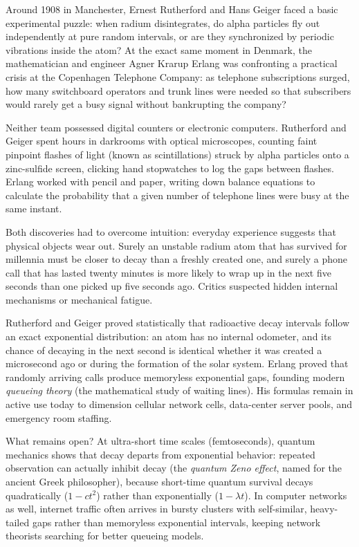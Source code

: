 \begin{historybox}
Around 1908 in Manchester, Ernest Rutherford and Hans Geiger faced a basic
experimental puzzle: when radium disintegrates, do alpha particles fly out
independently at pure random intervals, or are they synchronized by periodic
vibrations inside the atom? At the exact same moment in Denmark, the
mathematician and engineer Agner Krarup Erlang was confronting a practical
crisis at the Copenhagen Telephone Company: as telephone subscriptions surged,
how many switchboard operators and trunk lines were needed so that subscribers
would rarely get a busy signal without bankrupting the company?

Neither team possessed digital counters or electronic computers. Rutherford and
Geiger spent hours in darkrooms with optical microscopes, counting faint pinpoint
flashes of light (known as scintillations) struck by alpha particles onto a zinc-sulfide
screen, clicking hand stopwatches to log the gaps between flashes. Erlang worked with
pencil and paper, writing down balance equations to calculate the probability that
a given number of telephone lines were busy at the same instant.

Both discoveries had to overcome intuition: everyday experience suggests that physical
objects wear out. Surely an unstable radium atom that has survived for millennia must be
closer to decay than a freshly created one, and surely a phone call that has lasted twenty
minutes is more likely to wrap up in the next five seconds than one picked up five seconds
ago. Critics suspected hidden internal mechanisms or mechanical fatigue.

Rutherford and Geiger proved statistically that radioactive decay intervals
follow an exact exponential distribution: an atom has no internal odometer, and
its chance of decaying in the next second is identical whether it was created a
microsecond ago or during the formation of the solar system. Erlang proved that
randomly arriving calls produce memoryless exponential gaps, founding modern
\emph{queueing theory} (the mathematical study of waiting lines). His formulas
remain in active use today to dimension cellular network cells, data-center
server pools, and emergency room staffing.

What remains open? At ultra-short time scales (femtoseconds), quantum mechanics
shows that decay departs from exponential behavior: repeated observation can
actually inhibit decay (the \emph{quantum Zeno effect}, named for the ancient
Greek philosopher), because short-time quantum survival decays quadratically
($1 - c t^2$) rather than exponentially ($1 - \lambda t$). In
computer networks as well, internet traffic often arrives in bursty clusters with
self-similar, heavy-tailed gaps rather than memoryless exponential intervals,
keeping network theorists searching for better queueing models.
\end{historybox}

